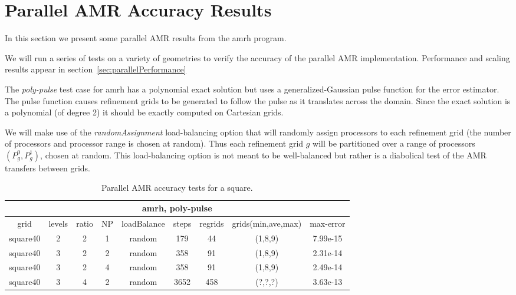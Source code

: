 \section{Parallel AMR Accuracy Results}\label{sec:parallelAccuracy}


In this section we present some parallel AMR results from the amrh program.

We will run a series of tests on a variety of geometries to verify the accuracy 
of the parallel AMR implementation. Performance and scaling results appear
in section~\ref{sec:parallelPerformance}


The {\em poly-pulse} test case for amrh has a polynomial exact solution
but uses a generalized-Gaussian pulse function for the error estimator. 
The pulse function causes refinement grids to be generated to follow the
pulse as it translates across the domain. Since the exact solution is a
polynomial (of degree 2) it should be exactly computed on Cartesian grids.


We will make use of the {\em randomAssignment} load-balancing option
that will randomly assign processors to each refinement grid (the number of
processors and processor range is chosen at random). Thus each refinement grid
$g$ will be partitioned over a range of
processors $(P^0_g,P^1_g)$,  chosen at random. This load-balancing option is not 
meant to be well-balanced but rather is a diabolical test of the AMR transfers
between grids.





\begin{table}[hbt]
\begin{center}\footnotesize
\begin{tabular}{|c|c|c|c|c|c|c|c|c|} \hline 
 \multicolumn{9}{|c|}{amrh, poly-pulse} \\\hline
  grid      & levels & ratio &  NP  &  loadBalance &  steps & regrids & grids(min,ave,max) & max-error \\ \hline
square40      &    2   &  2   &  1  & random        & 179  & 44     & (1,8,9) & 7.99e-15 \\
square40      &    3   &  2   &  2  & random        & 358  & 91     & (1,8,9) & 2.31e-14 \\
square40      &    3   &  2   &  4  & random        & 358  & 91    & (1,8,9) & 2.49e-14 \\
square40      &    3   &  4   &  2  & random        & 3652  & 458   & (?,?,?) & 3.63e-13 \\
\hline
\end{tabular}		
\end{center}		
\caption{Parallel AMR accuracy tests for a square.}
 \label{tab:parallelAccuracySquare} 
\end{table}


